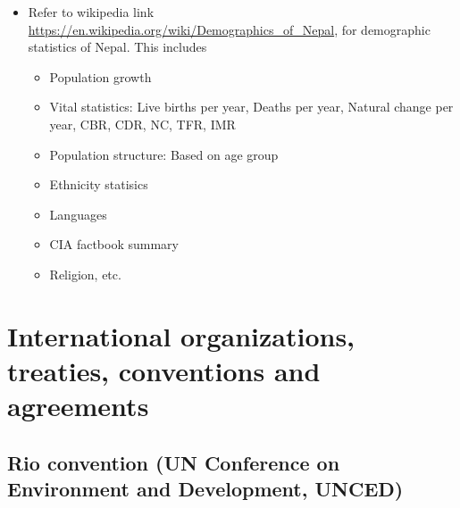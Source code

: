 \documentclass[]{book}
\providecommand{\tightlist}{%
  \setlength{\itemsep}{0pt}\setlength{\parskip}{0pt}}
\begin{document}
\begin{itemize}
\tightlist
\item
  Refer to wikipedia link \url{https://en.wikipedia.org/wiki/Demographics_of_Nepal}, for demographic statistics of Nepal. This includes

  \begin{itemize}
  \tightlist
  \item
    Population growth
  \item
    Vital statistics: Live births per year, Deaths per year, Natural change per year, CBR, CDR, NC, TFR, IMR
  \item
    Population structure: Based on age group
  \item
    Ethnicity statisics
  \item
    Languages
  \item
    CIA factbook summary
  \item
    Religion, etc.
  \end{itemize}
\end{itemize}

\hypertarget{international-organizations-treaties-conventions-and-agreements}{%
\chapter{International organizations, treaties, conventions and agreements}\label{international-organizations-treaties-conventions-and-agreements}}

\hypertarget{rio-convention-un-conference-on-environment-and-development-unced}{%
\section{Rio convention (UN Conference on Environment and Development, UNCED)}\label{rio-convention-un-conference-on-environment-and-development-unced}}
\end{document}
